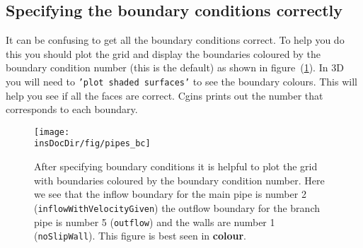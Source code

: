 \subsection{Specifying the boundary conditions correctly}

It can be confusing to get all the boundary conditions correct. To help you 
do this you should plot the grid and display the boundaries coloured by
the boundary condition number (this is the default) as shown in
figure~(\ref{fig:pipesBC}). In 3D you will need to
{\tt 'plot shaded surfaces'} to see the boundary colours.
This will help you see if all the faces are correct. Cgins prints out the 
number that corresponds to each boundary.
\begin{figure}[hb]
\begin{center}
  \texttt{[image: \\insDocDir/fig/pipes\_bc]}
 \caption{After specifying boundary conditions it is helpful to plot the grid with
    boundaries coloured by the boundary condition number. Here we see that the
    inflow boundary for the main pipe is number 2 ({\tt inflowWithVelocityGiven})
    the outflow boundary for the branch pipe is number 5 ({\tt outflow}) and the
   walls are number 1 ({\tt noSlipWall}). This figure is best seen in {\bf colour}.}
   \label{fig:pipesBC}
\end{center}
\end{figure}

